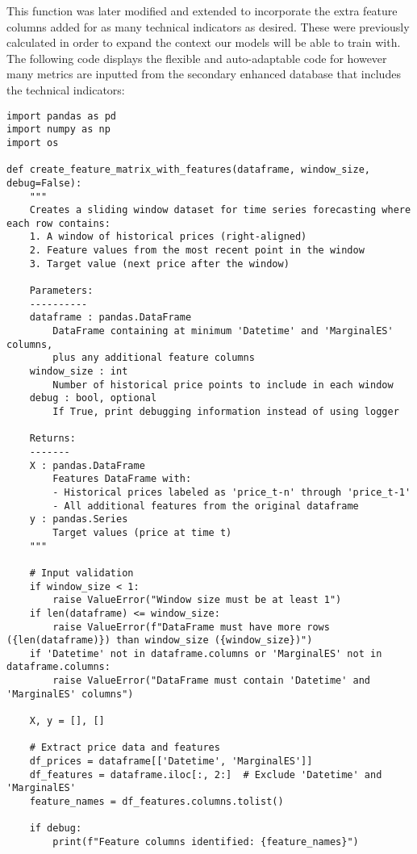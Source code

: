 \documentclass[12pt]{report} %
\begin{document}
This function was later modified and extended to incorporate the extra feature columns added for as many technical indicators as desired. These were previously calculated in order to expand the context our models will be able to train with. The following code displays the flexible and auto-adaptable code for however many metrics are inputted from the secondary enhanced database that includes the technical indicators:
\begin{lstlisting}
import pandas as pd
import numpy as np
import os

def create_feature_matrix_with_features(dataframe, window_size, debug=False):
    """
    Creates a sliding window dataset for time series forecasting where each row contains:
    1. A window of historical prices (right-aligned)
    2. Feature values from the most recent point in the window
    3. Target value (next price after the window)
    
    Parameters:
    ----------
    dataframe : pandas.DataFrame
        DataFrame containing at minimum 'Datetime' and 'MarginalES' columns, 
        plus any additional feature columns
    window_size : int
        Number of historical price points to include in each window
    debug : bool, optional
        If True, print debugging information instead of using logger
        
    Returns:
    -------
    X : pandas.DataFrame
        Features DataFrame with:
        - Historical prices labeled as 'price_t-n' through 'price_t-1'
        - All additional features from the original dataframe
    y : pandas.Series
        Target values (price at time t)
    """
    
    # Input validation
    if window_size < 1:
        raise ValueError("Window size must be at least 1")
    if len(dataframe) <= window_size:
        raise ValueError(f"DataFrame must have more rows ({len(dataframe)}) than window_size ({window_size})")
    if 'Datetime' not in dataframe.columns or 'MarginalES' not in dataframe.columns:
        raise ValueError("DataFrame must contain 'Datetime' and 'MarginalES' columns")
    
    X, y = [], []
    
    # Extract price data and features
    df_prices = dataframe[['Datetime', 'MarginalES']]
    df_features = dataframe.iloc[:, 2:]  # Exclude 'Datetime' and 'MarginalES'
    feature_names = df_features.columns.tolist()
    
    if debug:
        print(f"Feature columns identified: {feature_names}")
    

\end{lstlisting}
\end{document}
